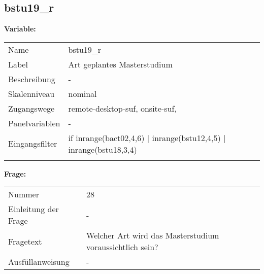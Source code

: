 	
	
	\subsection{bstu19\_r}
	\label{subSection:bstu19_r}

	\noindent\textbf{Variable:}\\
		\begin{tabular}{lL{11.3cm}}
			\label{tableVariable:bstu19_r}
			Name & bstu19\_r \\
			Label & Art geplantes Masterstudium \\
			Beschreibung & - \\
			Skalenniveau & nominal \\
			Zugangswege &
				remote-desktop-suf,
				onsite-suf,
 \\
			Panelvariablen & -
			 \\
			Eingangsfilter & if inrange(bact02,4,6) |  inrange(bstu12,4,5) | inrange(bstu18,3,4) \\
 \\
		\end{tabular}

		\vspace*{1 cm}
		\noindent\textbf{Frage:}\\
		\begin{tabular}{lL{11.3cm}}
			\label{tableQuestion:bstu19_r}
			Nummer & 28 \\
			Einleitung der Frage & - \\
			Fragetext & Welcher Art wird das Masterstudium voraussichtlich sein? \\
			Ausfüllanweisung & - \\
		\end{tabular}





